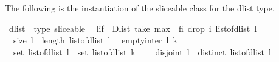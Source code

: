 %
\begin{isabellebody}%
%
%
\isamarkuptrue%
%
\begin{isamarkuptext}%
\label{sec:theory-sliceable-dlist}%
\end{isamarkuptext}\isamarkuptrue%
%
\isadelimtheory
%
\endisadelimtheory
%
\isatagtheory
%
\endisatagtheory
{\isafoldtheory}%
%
\isadelimtheory
%
\endisadelimtheory
%
\isadelimproof
%
\endisadelimproof
%
\isatagproof
%
\endisatagproof
{\isafoldproof}%
%
\isadelimproof
%
\endisadelimproof
%
\isadelimproof
%
\endisadelimproof
%
\isatagproof
%
\endisatagproof
{\isafoldproof}%
%
\isadelimproof
%
\endisadelimproof
%
\begin{isamarkuptext}%
The following is the instantiation of the sliceable class for the dlist type.%
\end{isamarkuptext}\isamarkuptrue%
\isamarkupfalse%
\ dlist\ {\isacharcolon}{\isacharcolon}\ {\isacharparenleft}type{\isacharparenright}\ sliceable\isanewline
{}\isanewline
\isanewline
{}\isamarkupfalse%
\isanewline
\ \ {\isachardoublequoteopen}l{\isasymdagger}i{\isachardot}{\isachardot}f\ {\isacharequal}\ Dlist\ {\isacharparenleft}take\ {\isacharparenleft}max\ {}\ {\isacharparenleft}f{\isacharminus}i{\isacharparenright}{\isacharparenright}\ {\isacharparenleft}drop\ i\ {\isacharparenleft}list{\isacharunderscore}of{\isacharunderscore}dlist\ l{\isacharparenright}{\isacharparenright}{\isacharparenright}{\isachardoublequoteclose}\isanewline
\isanewline
{}\isamarkupfalse%
\ \isanewline
\ \ {\isachardoublequoteopen}size\ l\ {\isacharequal}\ length\ {\isacharparenleft}list{\isacharunderscore}of{\isacharunderscore}dlist\ l{\isacharparenright}{\isachardoublequoteclose}\isanewline
\isanewline
{}\isamarkupfalse%
\isanewline
\ \ {\isachardoublequoteopen}empty{\isacharunderscore}inter\ l\ k\ {\isacharequal}\ \isanewline
\ \ {\isacharparenleft}{\isacharparenleft}set\ {\isacharparenleft}list{\isacharunderscore}of{\isacharunderscore}dlist\ l{\isacharparenright}{\isacharparenright}\ {\isasyminter}\ {\isacharparenleft}set\ {\isacharparenleft}list{\isacharunderscore}of{\isacharunderscore}dlist\ k{\isacharparenright}{\isacharparenright}\ {\isacharequal}\ {\isacharbraceleft}{\isacharbraceright}{\isacharparenright}{\isachardoublequoteclose}\isanewline
\isanewline
{}\isamarkupfalse%
\isanewline
\ \ {\isachardoublequoteopen}disjoint\ l\ {\isacharequal}\ distinct\ {\isacharparenleft}list{\isacharunderscore}of{\isacharunderscore}dlist\ l{\isacharparenright}{\isachardoublequoteclose}\isanewline

\end{isabellebody}
